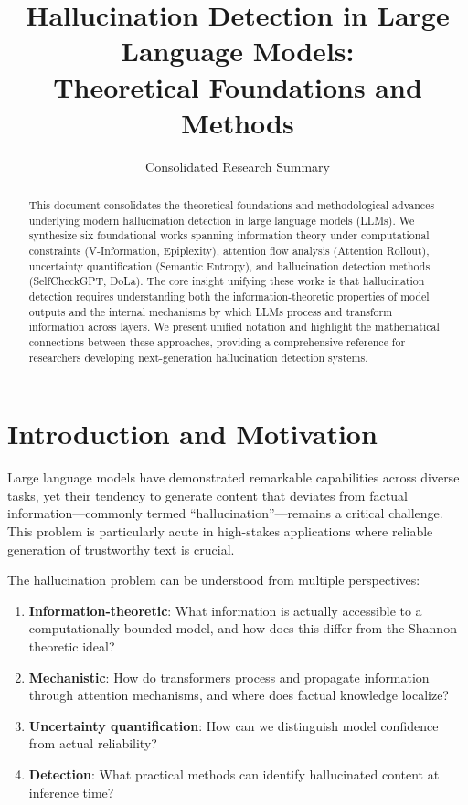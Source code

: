 \documentclass[11pt]{article}
\title{Hallucination Detection in Large Language Models:\\
Theoretical Foundations and Methods}
\author{Consolidated Research Summary}
\date{}
\begin{document}
\maketitle

\begin{abstract}
This document consolidates the theoretical foundations and methodological advances underlying modern hallucination detection in large language models (LLMs). We synthesize six foundational works spanning information theory under computational constraints (V-Information, Epiplexity), attention flow analysis (Attention Rollout), uncertainty quantification (Semantic Entropy), and hallucination detection methods (SelfCheckGPT, DoLa). The core insight unifying these works is that hallucination detection requires understanding both the information-theoretic properties of model outputs and the internal mechanisms by which LLMs process and transform information across layers. We present unified notation and highlight the mathematical connections between these approaches, providing a comprehensive reference for researchers developing next-generation hallucination detection systems.
\end{abstract}

\tableofcontents
\newpage

\section{Introduction and Motivation}

Large language models have demonstrated remarkable capabilities across diverse tasks, yet their tendency to generate content that deviates from factual information---commonly termed ``hallucination''---remains a critical challenge. This problem is particularly acute in high-stakes applications where reliable generation of trustworthy text is crucial.

The hallucination problem can be understood from multiple perspectives:
\begin{enumerate}
    \item \textbf{Information-theoretic}: What information is actually accessible to a computationally bounded model, and how does this differ from the Shannon-theoretic ideal?
    \item \textbf{Mechanistic}: How do transformers process and propagate information through attention mechanisms, and where does factual knowledge localize?
    \item \textbf{Uncertainty quantification}: How can we distinguish model confidence from actual reliability?
    \item \textbf{Detection}: What practical methods can identify hallucinated content at inference time?
\end{enumerate}
\end{document}
